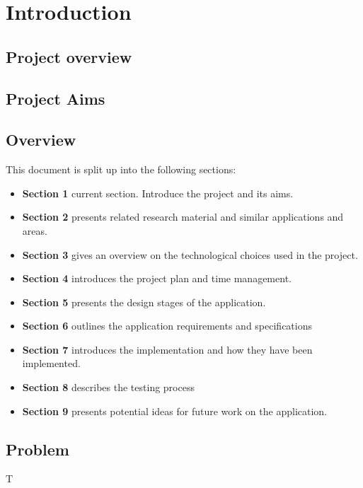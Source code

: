 
\section{Introduction}

\subsection{Project overview}
\lipsum[5-7]

\subsection{Project Aims}
\lipsum[3]



\subsection{Overview}
This document is split up into the following sections:
\begin{itemize}
 \item \textbf{Section 1} current section. Introduce the project and its aims.
 \item \textbf{Section 2} presents related research material and similar applications and areas.
 \item \textbf{Section 3} gives an overview on the technological choices used in the project.
 \item \textbf{Section 4} introduces the project plan and time management.
 \item \textbf{Section 5} presents the design stages of the application.
 \item \textbf{Section 6} outlines the application requirements and specifications
 \item \textbf{Section 7} introduces the implementation and how they have been implemented.
 \item \textbf{Section 8} describes the testing process
 \item \textbf{Section 9} presents potential ideas for future work on the application.
\end{itemize}

\subsection{Problem}
T\lipsum[4]


